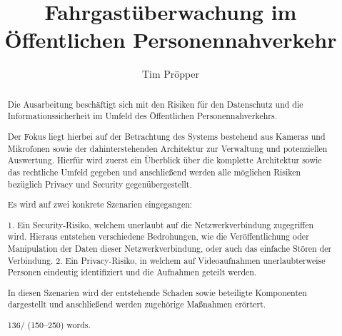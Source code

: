 \documentclass[runningheads]{llncs}
\begin{document}
\title{Fahrgastüberwachung im Öffentlichen Personennahverkehr}
\author{Tim Pröpper}

{\def\addcontentsline#1#2#3{}\maketitle}            %


\begin{abstract}
    Die Ausarbeitung beschäftigt sich mit den Risiken für den Datenschutz und die Informationssicherheit im Umfeld des
    Öffentlichen Personennahverkehrs.

    Der Fokus liegt hierbei auf der Betrachtung des Systems bestehend aus Kameras und Mikrofonen
    sowie der dahinterstehenden Architektur zur Verwaltung und potenziellen Auswertung. Hierfür wird zuerst ein Über\-blick über die komplette
    Architektur sowie das rechtliche Umfeld gegeben und anschließend werden alle möglichen Risiken bezüglich Privacy und Security gegenübergestellt.

    Es wird auf zwei konkrete Szenarien eingegangen:

    1. Ein Security-Risiko, welchem unerlaubt auf die Netzwerkverbindung zugegriffen wird. Hieraus entstehen verschiedene Bedrohungen,
    wie die Veröffentlichung oder Manipulation der Daten dieser Netzwerkverbin\-dung, oder auch das einfache Stören der Verbindung.
    2. Ein Privacy-Risiko, in welchem auf Videoaufnahmen unerlaubterweise Personen eindeutig identifiziert und die Aufnahmen geteilt werden.

    In diesen Szenarien wird der entstehende Schaden sowie beteiligte Komponenten dargestellt und anschließend werden zugehörige Maßnahmen erörtert.


    136/ (150--250) words.

\end{abstract}

\setcounter{tocdepth}{2}
\tableofcontents
\setcounter{page}{0}







\end{document}
